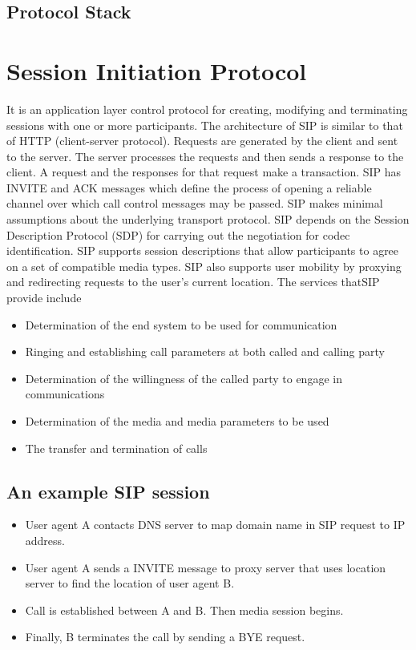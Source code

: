\documentclass[12pt]{Book}
\begin{document}
\pagebreak
    \subsection{Protocol Stack}
    
    \section{Session Initiation Protocol}
    It is an application layer control protocol for creating, modifying and terminating sessions with one or
    more participants. The architecture of SIP is similar to that of HTTP (client-server protocol). Requests are
    generated by the client and sent to the server. The server processes the requests and then sends a
    response to the client. A request and the responses for that request make a transaction. SIP has INVITE
    and ACK messages which define the process of opening a reliable channel over which call control
    messages may be passed. SIP makes minimal assumptions about the underlying transport protocol. SIP
    depends on the Session Description Protocol (SDP) for carrying out the negotiation for codec
    identification. SIP supports session descriptions that allow participants to agree on a set of compatible
    media types. SIP also supports user mobility by proxying and redirecting requests to the user’s current
    location. The services thatSIP provide include
    \begin{itemize}
        \item Determination of the end system to be used for communication
        \item Ringing and establishing call parameters at both called and calling party
        \item Determination of the willingness of the called party to engage in communications
        \item Determination of the media and media parameters to be used
        \item The transfer and termination of calls
    \end{itemize}
    
    \subsection{An example SIP session}
    \begin{itemize}
        \item User agent A contacts DNS
    server to map domain name in
    SIP request to IP address.
        \item User agent A sends a INVITE
    message to proxy server that
    uses location server to find the
    location of user agent B.
        \item Call is established between A
    and B. Then media session
    begins.
        \item Finally, B terminates the call
    by sending a BYE request.
    \end{itemize}
    
\end{document}
